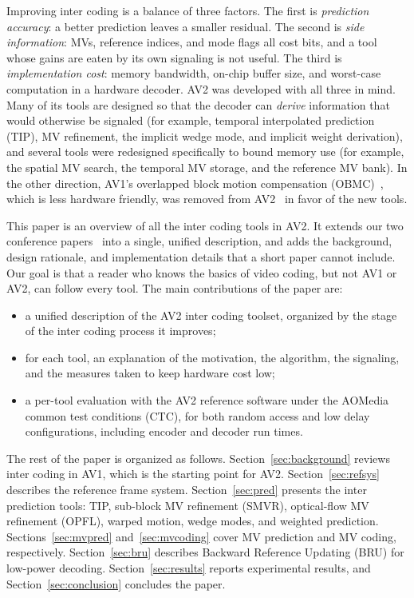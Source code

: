 \documentclass[journal]{IEEEtran}
\begin{document}
Improving inter coding is a balance of three factors. The first is
\emph{prediction accuracy}: a better prediction leaves a smaller residual.
The second is \emph{side information}: MVs, reference indices, and mode flags
all cost bits, and a tool whose gains are eaten by its own signaling is not
useful. The third is \emph{implementation cost}: memory bandwidth, on-chip
buffer size, and worst-case computation in a hardware decoder. AV2 was
developed with all three in mind. Many of its tools are designed so that the
decoder can \emph{derive} information that would otherwise be signaled (for
example, temporal interpolated prediction (TIP), MV refinement, the implicit
wedge mode, and implicit weight
derivation), and several tools were redesigned specifically to bound memory
use (for example, the spatial MV search, the temporal MV storage, and the
reference MV bank). In the other direction, AV1's overlapped block motion
compensation (OBMC)~\cite{av1obmc}, which is less hardware friendly, was removed
from AV2~\cite{cwgD165} in favor of the new tools.

This paper is an overview of all the inter coding tools in AV2. It extends our
two conference papers~\cite{av2inter_icip,av2warp_companion} into a single, unified
description, and adds the background, design rationale, and implementation
details that a short paper cannot include. Our goal is that a reader who knows
the basics of video coding, but not AV1 or AV2, can follow every tool. The
main contributions of the paper are:
\begin{itemize}
  \item a unified description of the AV2 inter coding toolset, organized by
        the stage of the inter coding process it improves;
  \item for each tool, an explanation of the motivation, the algorithm, the
        signaling, and the measures taken to keep hardware cost low;
  \item a per-tool evaluation with the AV2 reference software under the AOMedia
        common test conditions (CTC), for both random access and low delay
        configurations, including encoder and decoder run times.
\end{itemize}

The rest of the paper is organized as follows. Section~\ref{sec:background}
reviews inter coding in AV1, which is the starting point for AV2.
Section~\ref{sec:refsys} describes the reference frame system.
Section~\ref{sec:pred} presents the inter prediction tools: TIP, sub-block MV
refinement (SMVR), optical-flow MV refinement (OPFL), warped motion, wedge
modes, and weighted prediction.
Sections~\ref{sec:mvpred} and~\ref{sec:mvcoding} cover MV prediction and MV
coding, respectively. Section~\ref{sec:bru} describes Backward Reference
Updating (BRU) for low-power decoding. Section~\ref{sec:results} reports
experimental results, and Section~\ref{sec:conclusion} concludes the paper.
\end{document}
